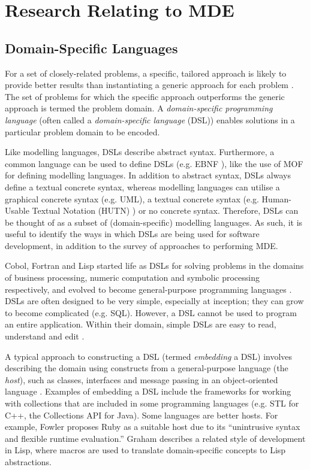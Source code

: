 
\section{Research Relating to MDE}
\label{sec:mde_related}

\subsection{Domain-Specific Languages}
For a set of closely-related problems, a specific, tailored approach is likely to provide better results than instantiating a generic approach for each problem \cite{deursen00dslbib}. The set of problems for which the specific approach outperforms the generic approach is termed the problem domain. A \textit{domain-specific programming language} (often called a \textit{domain-specific language} (DSL)) enables solutions in a particular problem domain to be encoded.

Like modelling languages, DSLs describe abstract syntax. Furthermore, a common language can be used to define DSLs (e.g. EBNF \cite{ebnf}), like the use of MOF for defining modelling languages. In addition to abstract syntax, DSLs always define a textual concrete syntax, whereas modelling languages can utilise a graphical concrete syntax (e.g. UML), a textual concrete syntax (e.g. Human-Usable Textual Notation (HUTN) \cite{hutn}) or no concrete syntax. Therefore, DSLs can be thought of as a subset of (domain-specific) modelling languages. As such, it is useful to identify the ways in which DSLs are being used for software development, in addition to the survey of approaches to performing MDE.

Cobol, Fortran and Lisp started life as DSLs for solving problems in the domains of business processing, numeric computation and symbolic processing respectively, and evolved to become general-purpose programming languages \cite{deursen00dslbib}. DSLs are often designed to be very simple, especially at inception; they can grow to become complicated (e.g. SQL). However, a DSL cannot be used to program an entire application. Within their domain, simple DSLs are easy to read, understand and edit \cite{fowler05language}.

A typical approach to constructing a DSL (termed \textit{embedding} a DSL) involves describing the domain using constructs from a general-purpose language (the \textit{host}), such as classes, interfaces and message passing in an object-oriented language \cite{dmitriev04lop}. Examples of embedding a DSL include the frameworks for working with collections that are included in some programming languages (e.g. STL for C++, the Collections API for Java). Some languages are better hosts. For example, Fowler \cite{fowler05language} proposes Ruby as a suitable host due to its ``unintrusive syntax and flexible runtime evaluation.'' Graham \cite{graham93lisp} describes a related style of development in Lisp, where macros are used to translate domain-specific concepts to Lisp abstractions.

